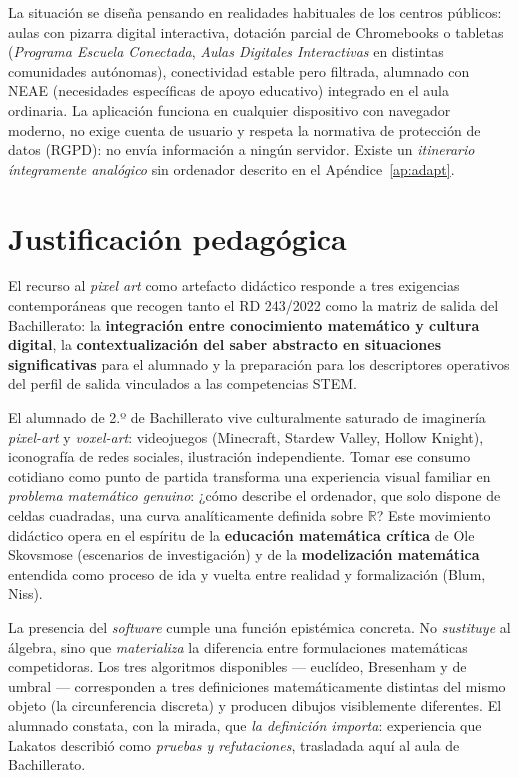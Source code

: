 \documentclass[12pt,a4paper]{scrartcl}
\newcommand{\acc}[1]{\textcolor{accent}{\textbf{#1}}}
\begin{document}
\begin{nota}
La situación se diseña pensando en realidades habituales de los centros públicos: aulas con pizarra digital interactiva, dotación parcial de Chromebooks o tabletas (\emph{Programa Escuela Conectada}, \emph{Aulas Digitales Interactivas} en distintas comunidades autónomas), conectividad estable pero filtrada, alumnado con NEAE (necesidades específicas de apoyo educativo) integrado en el aula ordinaria. La aplicación funciona en cualquier dispositivo con navegador moderno, no exige cuenta de usuario y respeta la normativa de protección de datos (RGPD): no envía información a ningún servidor. Existe un \emph{itinerario íntegramente analógico} sin ordenador descrito en el Apéndice~\ref{ap:adapt}.
\end{nota}

\section{Justificación pedagógica}

El recurso al \emph{pixel art} como artefacto didáctico responde a tres exigencias contemporáneas que recogen tanto el RD 243/2022 como la matriz de salida del Bachillerato: la \acc{integración entre conocimiento matemático y cultura digital}, la \acc{contextualización del saber abstracto en situaciones significativas} para el alumnado y la preparación para los descriptores operativos del perfil de salida vinculados a las competencias STEM.

El alumnado de 2.º de Bachillerato vive culturalmente saturado de imaginería \emph{pixel-art} y \emph{voxel-art}: videojuegos (Minecraft, Stardew Valley, Hollow Knight), iconografía de redes sociales, ilustración independiente. Tomar ese consumo cotidiano como punto de partida transforma una experiencia visual familiar en \emph{problema matemático genuino}: ¿cómo describe el ordenador, que solo dispone de celdas cuadradas, una curva analíticamente definida sobre $\mathbb{R}$? Este movimiento didáctico opera en el espíritu de la \acc{educación matemática crítica} de Ole Skovsmose (escenarios de investigación) y de la \acc{modelización matemática} entendida como proceso de ida y vuelta entre realidad y formalización (Blum, Niss).

La presencia del \emph{software} cumple una función epistémica concreta. No \emph{sustituye} al álgebra, sino que \emph{materializa} la diferencia entre formulaciones matemáticas competidoras. Los tres algoritmos disponibles --- euclídeo, Bresenham y de umbral --- corresponden a tres definiciones matemáticamente distintas del mismo objeto (la circunferencia discreta) y producen dibujos visiblemente diferentes. El alumnado constata, con la mirada, que \emph{la definición importa}: experiencia que Lakatos describió como \emph{pruebas y refutaciones}, trasladada aquí al aula de Bachillerato.
\end{document}
